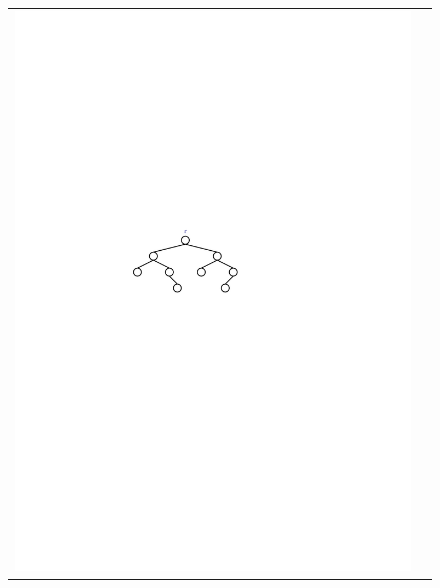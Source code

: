 \begin{figure}
  \begin{center}
    \begin{tabular}{cc}
      \includegraphics[width=\HalfScaleIfNeeded]{figs/bintree-1} &

\end{tabular}
\end{center}
\end{figure}
